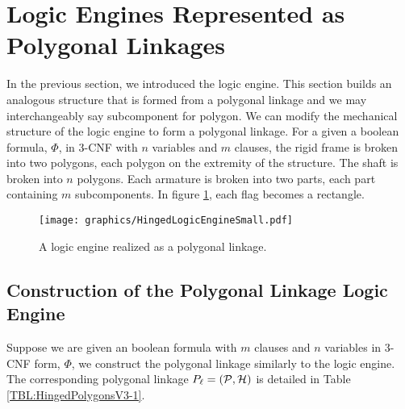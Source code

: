 \section{Logic Engines Represented as Polygonal Linkages}   
In the previous section, we introduced the logic engine.  
This section builds an analogous structure that is formed from a polygonal linkage and we may interchangeably say subcomponent for polygon.
We can modify the mechanical structure of the logic engine to form a polygonal linkage.  
For a given a boolean formula, $\Phi$, in 3-CNF with $n$ variables and $m$ clauses,
the rigid frame is broken into two polygons, each polygon on the extremity of the structure.
The shaft is broken into $n$ polygons.
Each armature is broken into two parts, each part containing $m$ subcomponents.
In figure \ref{fig:HingedLogicEngineSmall.pdf}, each flag becomes a rectangle.

\begin{figure}[!htbp]
\begin{center}
\texttt{[image: graphics/HingedLogicEngineSmall.pdf]}
\caption{A logic engine realized as a polygonal linkage.}\label{fig:HingedLogicEngineSmall.pdf}
\end{center}
\end{figure}
\subsection{Construction of the Polygonal Linkage Logic Engine}
Suppose we are given an boolean formula with $m$ clauses and $n$ variables in 3-CNF form, $\Phi$, we construct the polygonal linkage similarly to the logic engine.
The corresponding polygonal linkage $P_\ell = ({\cal P},{\cal H})$ is detailed in Table \ref{TBL:HingedPolygonsV3-1}.


